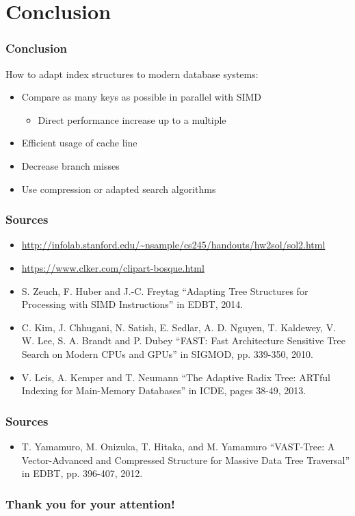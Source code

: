 \documentclass{beamer}
\begin{document}
\section{Conclusion}
\begin{frame}
\frametitle{Conclusion}
How to adapt index structures to modern database systems:
\begin{itemize}
	\item Compare as many keys as possible in parallel with SIMD
	\begin{itemize}
		\item Direct performance increase up to a multiple
	\end{itemize}
	\item Efficient usage of cache line
	\item Decrease branch misses
	\item Use compression or adapted search algorithms
	\end{itemize}
\end{frame}

\begin{frame}
\frametitle{Sources}
\begin{itemize}
	\item \url{http://infolab.stanford.edu/~nsample/cs245/handouts/hw2sol/sol2.html}
	\item \url{https://www.clker.com/clipart-bosque.html}
	\item S. Zeuch, F. Huber and J.-C. Freytag  ``Adapting Tree Structures for Processing with SIMD Instructions'' in EDBT, 2014.
	\item C. Kim, J. Chhugani, N. Satish, E. Sedlar, A. D. Nguyen, T. Kaldewey, V. W. Lee, S. A. Brandt and P. Dubey ``FAST: Fast Architecture Sensitive Tree Search on Modern CPUs and GPUs'' in SIGMOD, pp. 339-350, 2010.
	\item V. Leis, A. Kemper and T. Neumann ``The Adaptive Radix Tree: ARTful Indexing for Main-Memory Databases'' in ICDE, pages 38-49, 2013.
\end{itemize}
\end{frame}

\begin{frame}
\frametitle{Sources}
\begin{itemize}
	\item T. Yamamuro, M. Onizuka, T. Hitaka, and M. Yamamuro ``VAST-Tree: A Vector-Advanced and Compressed Structure for Massive Data Tree Traversal'' in EDBT, pp. 396-407, 2012.
\end{itemize}
\end{frame}

\begin{frame}
 \frametitle{Thank you for your attention!}
\end{frame}
\end{document}
